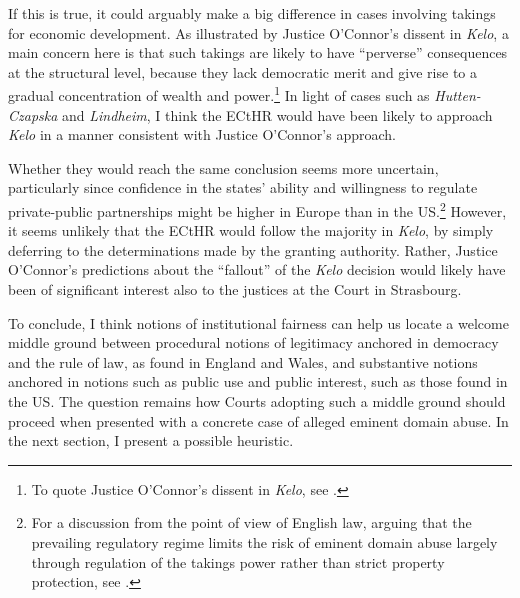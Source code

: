 If this is true, it could arguably make a big difference in cases involving takings for economic development. As illustrated by Justice O'Connor's dissent in {\it Kelo}, a main concern here is that such takings are likely to have ``perverse'' consequences at the structural level, because they lack democratic merit and give rise to a gradual concentration of wealth and power.\footnote{To quote Justice O'Connor's dissent in {\it Kelo}, see \cite{kelo05}.} In light of cases such as {\it Hutten-Czapska} and {\it Lindheim}, I think the ECtHR would have been likely to approach {\it Kelo} in a manner consistent with Justice O'Connor's approach.

Whether they would reach the same conclusion seems more uncertain, particularly since confidence in the states' ability and willingness to regulate private-public partnerships might be higher in Europe than in the US.\footnote{For a discussion from the point of view of English law, arguing that the prevailing regulatory regime limits the risk of eminent domain abuse largely through regulation of the takings power rather than strict property protection, see \cite{allen08}.} However, it seems unlikely that the ECtHR would follow the majority in {\it Kelo}, by simply deferring to the determinations made by the granting authority. Rather, Justice O'Connor's predictions about the ``fallout'' of the {\it Kelo} decision would likely have been of significant interest also to the justices at the Court in Strasbourg.

To conclude, I think notions of institutional fairness can help us locate a welcome middle ground between procedural notions of legitimacy anchored in democracy and the rule of law, as found in England and Wales, and substantive notions anchored in notions such as public use and public interest, such as those found in the US. The question remains how Courts adopting such a middle ground should proceed when presented with a concrete case of alleged eminent domain abuse. In the next section, I present a possible heuristic.


